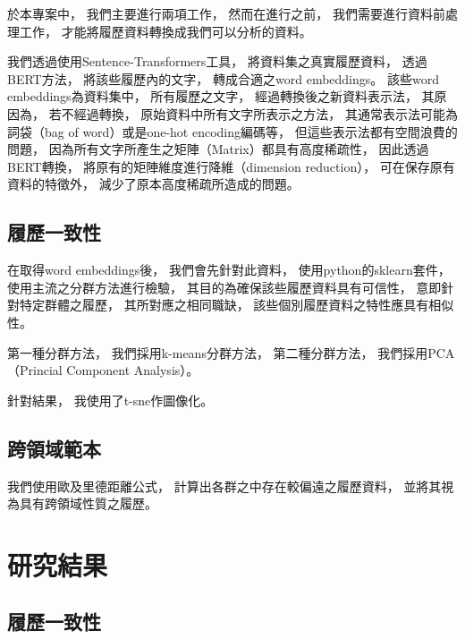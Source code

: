\documentclass[acmsmall]{acmart}
\begin{document}
於本專案中，
我們主要進行兩項工作，
然而在進行之前，
我們需要進行資料前處理工作，
才能將履歷資料轉換成我們可以分析的資料。

我們透過使用Sentence-Transformers\cite{reimers-2020-multilingual-sentence-bert}工具，
將資料集之真實履歷資料，
透過BERT方法\cite{devlin2018bert}，
將該些履歷內的文字，
轉成合適之word embeddings。
該些word embeddings為資料集中，
所有履歷之文字，
經過轉換後之新資料表示法，
其原因為，
若不經過轉換，
原始資料中所有文字所表示之方法，
其通常表示法可能為詞袋（bag of word）或是one-hot encoding編碼等，
但這些表示法都有空間浪費的問題，
因為所有文字所產生之矩陣（Matrix）都具有高度稀疏性\cite{schutze2008introduction}，
因此透過BERT轉換\cite{devlin2018bert}，
將原有的矩陣維度進行降維（dimension reduction），
可在保存原有資料的特徵外，
減少了原本高度稀疏所造成的問題。

\subsection{履歷一致性}

在取得word embeddings後，
我們會先針對此資料，
使用python的sklearn\cite{sklearn_api}套件，
使用主流之分群方法進行檢驗\cite{han2011data}，
其目的為確保該些履歷資料具有可信性，
意即針對特定群體之履歷，
其所對應之相同職缺，
該些個別履歷資料之特性應具有相似性。

第一種分群方法，
我們採用k-means分群方法\cite{macqueen1967some}，
第二種分群方法，
我們採用PCA（Princial Component Analysis）\cite{pearson1901liii}。

針對結果，
我使用了t-sne\cite{van2008visualizing}作圖像化。


\subsection{跨領域範本}

我們使用歐及里德距離公式，
計算出各群之中存在較偏遠之履歷資料，
並將其視為具有跨領域性質之履歷。

\section{研究結果}

\subsection{履歷一致性}
\end{document}
